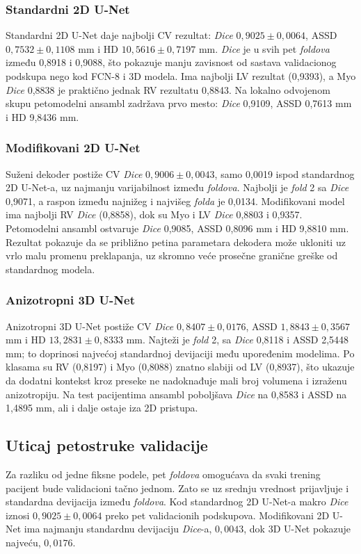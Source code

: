 \documentclass[11pt,a4paper]{article}
\begin{document}
\subsubsection{Standardni 2D U-Net}
Standardni 2D U-Net daje najbolji CV rezultat: \textit{Dice} $0{,}9025\pm0{,}0064$, ASSD
$0{,}7532\pm0{,}1108$ mm i HD $10{,}5616\pm0{,}7197$ mm. \textit{Dice} je u svih pet \textit{foldova} između 0,8918 i
0,9088, što pokazuje manju zavisnost od sastava validacionog podskupa nego kod FCN-8 i 3D modela.
Ima najbolji LV rezultat (0,9393), a Myo \textit{Dice} 0,8838 je praktično jednak RV rezultatu 0,8843. Na
lokalno odvojenom skupu petomodelni ansambl zadržava prvo mesto: \textit{Dice} 0,9109, ASSD 0,7613 mm i HD
9,8436 mm.

\subsubsection{Modifikovani 2D U-Net}
Suženi dekoder postiže CV \textit{Dice} $0{,}9006\pm0{,}0043$, samo 0,0019 ispod standardnog 2D U-Net-a, uz
najmanju varijabilnost između \textit{foldova}. Najbolji je \textit{fold} 2 sa \textit{Dice} 0,9071, a raspon između najnižeg
i najvišeg \textit{folda} je 0,0134. Modifikovani model ima najbolji RV \textit{Dice} (0,8858), dok su Myo i LV \textit{Dice}
0,8803 i 0,9357. Petomodelni ansambl ostvaruje \textit{Dice} 0,9085, ASSD 0,8096 mm i HD 9,8810 mm. Rezultat
pokazuje da se približno petina parametara dekodera može ukloniti uz vrlo malu promenu preklapanja,
uz skromno veće prosečne granične greške od standardnog modela.

\subsubsection{Anizotropni 3D U-Net}
Anizotropni 3D U-Net postiže CV \textit{Dice} $0{,}8407\pm0{,}0176$, ASSD $1{,}8843\pm0{,}3567$ mm i HD
$13{,}2831\pm0{,}8333$ mm. Najteži je \textit{fold} 2, sa \textit{Dice} 0,8118 i ASSD 2,5448 mm; to doprinosi
najvećoj standardnoj devijaciji među upoređenim modelima. Po klasama su RV (0,8197) i Myo (0,8088)
znatno slabiji od LV (0,8937), što ukazuje da dodatni kontekst kroz preseke ne nadoknađuje mali
broj volumena i izraženu anizotropiju. Na test pacijentima ansambl poboljšava \textit{Dice} na 0,8583 i ASSD
na 1,4895 mm, ali i dalje ostaje iza 2D pristupa.

\subsection{Uticaj petostruke validacije}
Za razliku od jedne fiksne podele, pet \textit{foldova} omogućava da svaki trening pacijent bude validacioni
tačno jednom. Zato se uz srednju vrednost prijavljuje i standardna devijacija između \textit{foldova}. Kod
standardnog 2D U-Net-a makro \textit{Dice} iznosi $0{,}9025\pm0{,}0064$ preko pet validacionih podskupova.
Modifikovani 2D U-Net ima najmanju standardnu devijaciju \textit{Dice}-a, $0{,}0043$, dok 3D U-Net pokazuje
najveću, $0{,}0176$.
\end{document}
